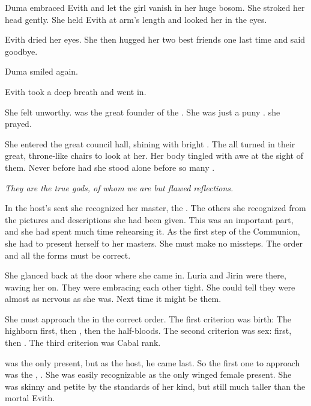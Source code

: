 \Mistress Duma embraced Evith and let the girl vanish in her huge bosom. 
She stroked her head gently. 
She held Evith at arm's length and looked her in the eyes.

Evith dried her eyes. 
She then hugged her two best friends one last time and said goodbye. 

Duma smiled again. 

Evith took a deep breath and went in. 

She felt unworthy. 
\Thanatzil was the great founder of the \resphain.
She was just a puny \human.
 she prayed.

She entered the great council hall, shining with bright \glowmoss. 
The \resphain all turned in their great, throne-like chairs to look at her. 
Her body tingled with awe at the sight of them. 
Never before had she stood alone before so many \resphain. 

\emph{They are the true gods, of whom we \humans are but flawed reflections.}

In the host's seat she recognized her master, the \ketheran \Teshrial. 
The others she recognized from the pictures and descriptions she had been given. 
This was an important part, and she had spent much time rehearsing it. 
As the first step of the Communion, she had to present herself to her \resphan masters. 
She must make no missteps.
The order and all the forms must be correct. 

She glanced back at the door where she came in.
Luria and Jirin were there, waving her on. 
They were embracing each other tight. 
She could tell they were almost as nervous as she was.
Next time it might be them. 

She must approach the \resphain in the correct order.
The first criterion was birth: 
The highborn \ketherain first, then \thelyadeth, then the \bezed half-bloods. 
The second criterion was sex: 
\Resviel first, then \resphain. 
The third criterion was Cabal rank. 

\Teshrial was the only \ketheran present, but as the host, he came last. 
So the first one to approach was the \thelyad \resvil, \Urizeth. 
She was easily recognizable as the only winged female present. 
She was skinny and petite by the standards of her kind, but still much taller than the mortal Evith.

